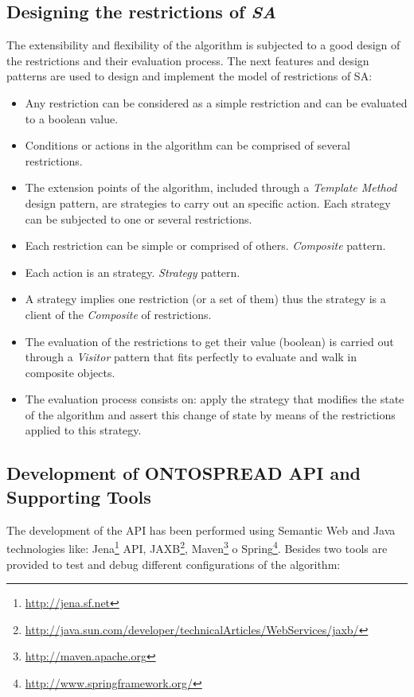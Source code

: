 \subsection{Designing the restrictions of \textit{SA}}
The extensibility and flexibility of the algorithm is subjected to a good design
of the restrictions and their evaluation process. The next features and design patterns 
are used to design and implement the model of restrictions of SA:
\begin{itemize}
  \item Any restriction can be considered as a simple restriction and can be
evaluated to a boolean value.
  \item Conditions or actions in the algorithm can be comprised of several
restrictions.
  \item The extension points of the algorithm, included through a
\textit{Template Method} design pattern, are strategies to carry out an specific
action. Each strategy can be subjected to one or several restrictions.
\item Each restriction can be simple or comprised of others. \textit{Composite} pattern.
  \item Each action is an strategy. \textit{Strategy} pattern.
  \item A strategy implies one restriction (or a set of them) thus the strategy
is a client of the \textit{Composite} of restrictions.
  \item The evaluation of the restrictions to get their value (boolean) is
carried out through a \textit{Visitor} pattern that fits perfectly to evaluate and walk in
composite objects.
  \item The evaluation process consists on: apply the strategy that modifies the state
of the algorithm and assert this change of state by means of the restrictions applied
to this strategy.
\end{itemize}

\subsection{Development of ONTOSPREAD API and Supporting Tools}
The development of the API has been performed using Semantic Web and Java technologies
like: Jena\footnote{\url{http://jena.sf.net}} API, JAXB\footnote{\url{
http://java.sun.com/developer/technicalArticles/WebServices/jaxb/}}, 
Maven\footnote{\url{http://maven.apache.org}} o
Spring\footnote{\url{http://www.springframework.org/}}. Besides two tools are provided to test and debug different configurations
of the algorithm:


